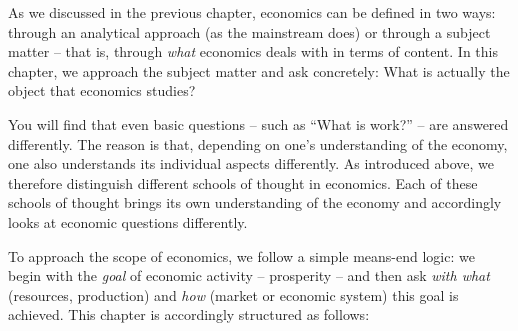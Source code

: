 \documentclass[
  british,
  a4paper,
  DIV=11,
  numbers=noendperiod,
  oneside,
  openany]{scrreprt}
\begin{document}
As we discussed in the previous chapter, economics can be defined in two
ways: through an analytical approach (as the mainstream does) or through
a subject matter -- that is, through \emph{what} economics deals with in
terms of content. In this chapter, we approach the subject matter and
ask concretely: What is actually the object that economics studies?

You will find that even basic questions -- such as ``What is work?'' --
are answered differently. The reason is that, depending on one's
understanding of the economy, one also understands its individual
aspects differently. As introduced above, we therefore distinguish
different schools of thought in economics. Each of these schools of
thought brings its own understanding of the economy and accordingly
looks at economic questions differently.

To approach the scope of economics, we follow a simple means-end logic:
we begin with the \emph{goal} of economic activity -- prosperity -- and
then ask \emph{with what} (resources, production) and \emph{how} (market
or economic system) this goal is achieved. This chapter is accordingly
structured as follows:
\end{document}
